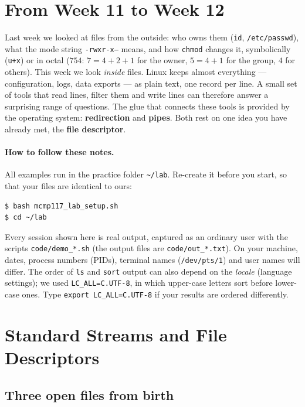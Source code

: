 \documentclass[11pt,a4paper]{article}
\newcommand{\term}[1]{\textbf{\color{mintdeep}#1}}
\newcommand{\cmd}[1]{\texttt{#1}}
\begin{document}
\setcounter{tocdepth}{1}
\tableofcontents

\section{From Week 11 to Week 12}

Last week we looked at files from the outside: who owns them (\cmd{id}, \texttt{/etc/passwd}), what the mode string \texttt{-rwxr-x---} means, and how \cmd{chmod} changes it, symbolically (\cmd{u+x}) or in octal ($754$: $7 = 4+2+1$ for the owner, $5 = 4+1$ for the group, $4$ for others). This week we look \emph{inside} files. Linux keeps almost everything --- configuration, logs, data exports --- as plain text, one record per line. A small set of tools that read lines, filter them and write lines can therefore answer a surprising range of questions. The glue that connects these tools is provided by the operating system: \term{redirection} and \term{pipes}. Both rest on one idea you have already met, the \term{file descriptor}.

\paragraph{How to follow these notes.} All examples run in the practice folder \texttt{\textasciitilde/lab}. Re-create it before you start, so that your files are identical to ours:
\begin{lstlisting}[style=term]
$ bash mcmp117_lab_setup.sh
$ cd ~/lab
\end{lstlisting}
Every session shown here is real output, captured as an ordinary user with the scripts \texttt{code/demo\_*.sh} (the output files are \texttt{code/out\_*.txt}). On your machine, dates, process numbers (PIDs), terminal names (\texttt{/dev/pts/1}) and user names will differ. The order of \cmd{ls} and \cmd{sort} output can also depend on the \emph{locale} (language settings); we used \cmd{LC\_ALL=C.UTF-8}, in which upper-case letters sort before lower-case ones. Type \cmd{export LC\_ALL=C.UTF-8} if your results are ordered differently.

\section{Standard Streams and File Descriptors}
\label{sec:streams}

\subsection{Three open files from birth}
\end{document}
